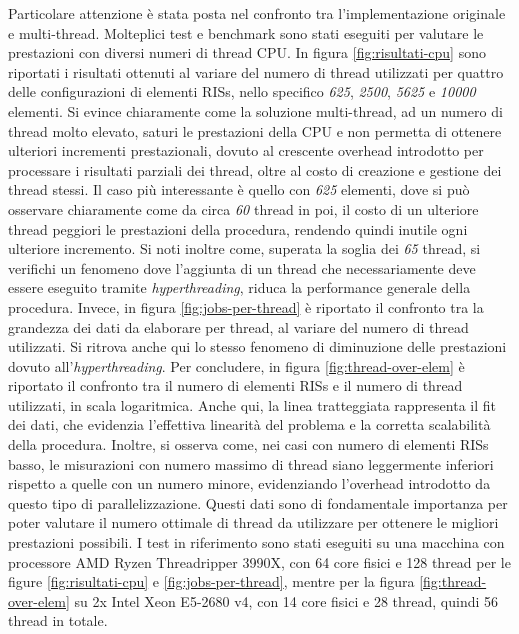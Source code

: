 Particolare attenzione è stata posta nel confronto tra l'implementazione
originale e multi-thread. Molteplici test e benchmark sono stati eseguiti per valutare
le prestazioni con diversi numeri di thread CPU. In figura
\ref{fig:risultati-cpu} sono riportati i risultati ottenuti al variare del
numero di thread utilizzati per quattro delle configurazioni di elementi RISs, nello
specifico \textit{625}, \textit{2500}, \textit{5625} e \textit{10000} elementi.
Si evince chiaramente come la soluzione multi-thread, ad un numero di thread molto
elevato, saturi le prestazioni della CPU e non permetta di ottenere ulteriori
incrementi prestazionali, dovuto al crescente overhead introdotto per processare
i risultati parziali dei thread, oltre al costo di creazione e gestione dei
thread stessi. Il caso più interessante è quello con \textit{625} elementi, dove
si può osservare chiaramente come da circa \textit{60} thread in poi, il costo di
un ulteriore thread peggiori le prestazioni della procedura, rendendo quindi
inutile ogni ulteriore incremento. Si noti inoltre come, superata la soglia dei
\textit{65} thread, si verifichi un fenomeno dove l'aggiunta di un thread che
necessariamente deve essere eseguito tramite \textit{hyperthreading}, riduca la
performance generale della procedura. Invece, in figura
\ref{fig:jobs-per-thread} è riportato il confronto tra la grandezza dei dati da
elaborare per thread, al variare del numero di thread utilizzati. Si ritrova
anche qui lo stesso fenomeno di diminuzione delle prestazioni dovuto all'\textit{hyperthreading}.
Per concludere, in figura \ref{fig:thread-over-elem} è riportato il confronto tra
il numero di elementi RISs e il numero di thread utilizzati, in scala
logaritmica. Anche qui, la linea tratteggiata rappresenta il fit dei dati, che evidenzia
l'effettiva linearità del problema e la corretta scalabilità della procedura.
Inoltre, si osserva come, nei casi con numero di elementi RISs basso, le misurazioni
con numero massimo di thread siano leggermente inferiori rispetto a quelle con un
numero minore, evidenziando l'overhead introdotto da questo tipo di
parallelizzazione. Questi dati sono di fondamentale importanza per poter valutare
il numero ottimale di thread da utilizzare per ottenere le migliori prestazioni possibili.
I test in riferimento sono stati eseguiti su una macchina con processore AMD
Ryzen Threadripper 3990X, con 64 core fisici e 128 thread per le figure \ref{fig:risultati-cpu}
e \ref{fig:jobs-per-thread}, mentre per la figura \ref{fig:thread-over-elem} su
2x Intel Xeon E5-2680 v4, con 14 core fisici e 28 thread, quindi 56 thread in
totale.

